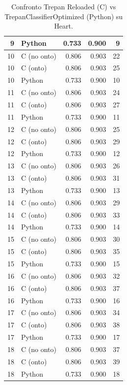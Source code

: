 \begin{table}[ht]
\begin{tabular}{r l r r r}
9 & Python       & 0.733 & 0.900 & 9 \\
\midrule
10 & C (no onto)  & 0.806 & 0.903 & 22 \\
10 & C (onto)     & 0.806 & 0.903 & 25 \\
10 & Python       & 0.733 & 0.900 & 10 \\
\midrule
11 & C (no onto)  & 0.806 & 0.903 & 24 \\
11 & C (onto)     & 0.806 & 0.903 & 27 \\
11 & Python       & 0.733 & 0.900 & 11 \\
\midrule
12 & C (no onto)  & 0.806 & 0.903 & 25 \\
12 & C (onto)     & 0.806 & 0.903 & 29 \\
12 & Python       & 0.733 & 0.900 & 12 \\
\midrule
13 & C (no onto)  & 0.806 & 0.903 & 26 \\
13 & C (onto)     & 0.806 & 0.903 & 31 \\
13 & Python       & 0.733 & 0.900 & 13 \\
\midrule
14 & C (no onto)  & 0.806 & 0.903 & 29 \\
14 & C (onto)     & 0.806 & 0.903 & 33 \\
14 & Python       & 0.733 & 0.900 & 14 \\
\midrule
15 & C (no onto)  & 0.806 & 0.903 & 30 \\
15 & C (onto)     & 0.806 & 0.903 & 35 \\
15 & Python       & 0.733 & 0.900 & 15 \\
\midrule
16 & C (no onto)  & 0.806 & 0.903 & 32 \\
16 & C (onto)     & 0.806 & 0.903 & 37 \\
16 & Python       & 0.733 & 0.900 & 16 \\
\midrule
17 & C (no onto)  & 0.806 & 0.903 & 34 \\
17 & C (onto)     & 0.806 & 0.903 & 38 \\
17 & Python       & 0.733 & 0.900 & 17 \\
\midrule
18 & C (no onto)  & 0.806 & 0.903 & 37 \\
18 & C (onto)     & 0.806 & 0.903 & 39 \\
18 & Python       & 0.733 & 0.900 & 18 \\
\bottomrule
\end{tabular}
\caption{Confronto Trepan Reloaded (C) vs TrepanClassifierOptimized (Python) su Heart.}
\label{tab:c_vs_python_heart}
\end{table}